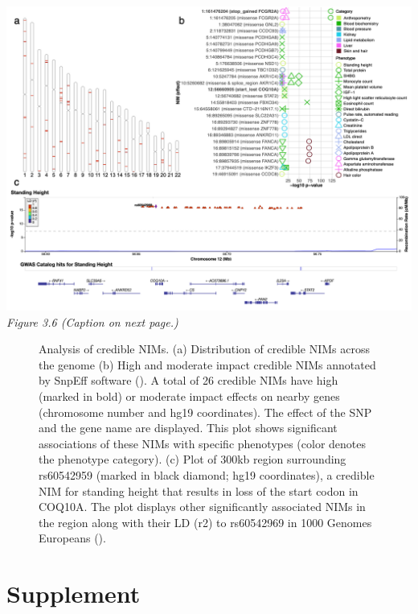\clearpage
\begin{center}
        \includegraphics[width=\textwidth]{chapter3/figures/fig3.6.png}
        \emph{Figure 3.6 (Caption on next page.)}
\end{center}
\begin{figure}[!htb]
    \centering
    \caption{Analysis of credible NIMs. (a) Distribution of credible NIMs across the genome (b) High and moderate impact credible NIMs annotated by SnpEff software (\cite{cingolani2012program}). A total of 26 credible NIMs have high (marked in bold) or moderate impact effects on nearby genes (chromosome number and hg19 coordinates). The effect of the SNP and the gene name are displayed. This plot shows significant associations of these NIMs with specific phenotypes (color denotes the phenotype category). (c) Plot of 300kb region surrounding rs60542959 (marked in black diamond; hg19 coordinates), a credible NIM for standing height that results in loss of the start codon in COQ10A.  The plot displays other significantly associated NIMs in the region along with their LD (r2) to rs60542969 in 1000 Genomes Europeans (\cite{boughton2021locuszoom.js:}).}
    \label{fig:3.6}
\end{figure}


\section{Supplement}